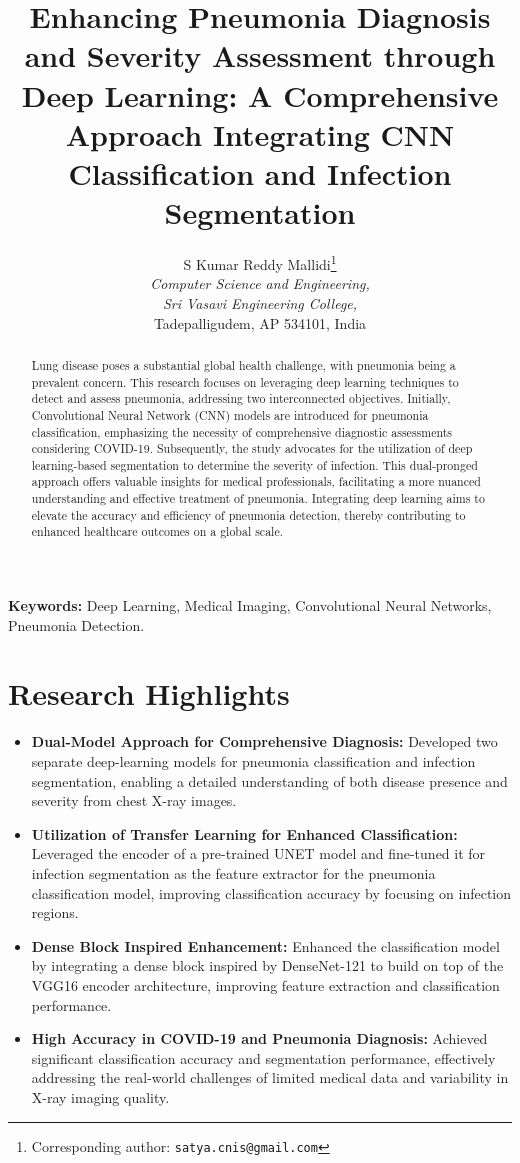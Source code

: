 \documentclass[10pt]{article}
\title{Enhancing Pneumonia Diagnosis and Severity Assessment through Deep Learning: A Comprehensive Approach Integrating CNN Classification and Infection Segmentation}
\author{
    S Kumar Reddy Mallidi\thanks{Corresponding author: \texttt{satya.cnis@gmail.com}} \\
    \textit{Computer Science and Engineering,} \\
    \textit{Sri Vasavi Engineering College,} \\
    Tadepalligudem, AP 534101, India
}
\date{}  %
\begin{document}
\maketitle

\begin{abstract}
Lung disease poses a substantial global health challenge, with pneumonia being a prevalent concern. This research focuses on leveraging deep learning techniques to detect and assess pneumonia, addressing two interconnected objectives. Initially, Convolutional Neural Network (CNN) models are introduced for pneumonia classification, emphasizing the necessity of comprehensive diagnostic assessments considering COVID-19. Subsequently, the study advocates for the utilization of deep learning-based segmentation to determine the severity of infection. This dual-pronged approach offers valuable insights for medical professionals, facilitating a more nuanced understanding and effective treatment of pneumonia. Integrating deep learning aims to elevate the accuracy and efficiency of pneumonia detection, thereby contributing to enhanced healthcare outcomes on a global scale.
\end{abstract}

\noindent\textbf{Keywords:} Deep Learning, Medical Imaging, Convolutional Neural Networks, Pneumonia Detection.

\section*{Research Highlights}
\begin{itemize}
    \item \textbf{Dual-Model Approach for Comprehensive Diagnosis:} Developed two separate deep-learning models for pneumonia classification and infection segmentation, enabling a detailed understanding of both disease presence and severity from chest X-ray images.
    \item \textbf{Utilization of Transfer Learning for Enhanced Classification:} Leveraged the encoder of a pre-trained UNET model and fine-tuned it for infection segmentation as the feature extractor for the pneumonia classification model, improving classification accuracy by focusing on infection regions.
    \item \textbf{Dense Block Inspired Enhancement:} Enhanced the classification model by integrating a dense block inspired by DenseNet-121 to build on top of the VGG16 encoder architecture, improving feature extraction and classification performance.
    \item \textbf{High Accuracy in COVID-19 and Pneumonia Diagnosis:} Achieved significant classification accuracy and segmentation performance, effectively addressing the real-world challenges of limited medical data and variability in X-ray imaging quality.
\end{itemize}
\end{document}
